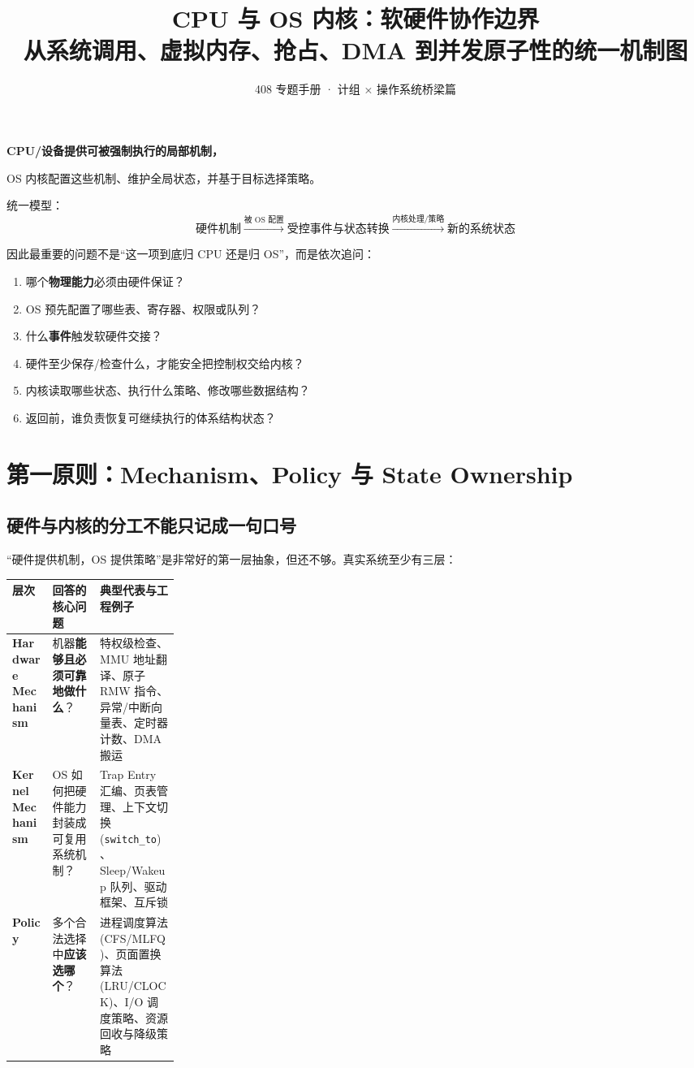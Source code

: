 \documentclass[11pt,a4paper]{ctexart}
\title{\vspace{-1.2cm}\textbf{CPU 与 OS 内核：软硬件协作边界}\\[0.35em]
\large 从系统调用、虚拟内存、抢占、DMA 到并发原子性的统一机制图}
\author{408 专题手册 · 计组 × 操作系统桥梁篇}
\date{}
\newcommand{\kw}[1]{\textbf{#1}}
\newcommand{\code}[1]{\texttt{#1}}
\begin{document}
\maketitle

\begin{corebox}
\begin{center}
\Large\bfseries CPU/设备提供可被强制执行的局部机制，\par
OS 内核配置这些机制、维护全局状态，并基于目标选择策略。
\end{center}

统一模型：
\[
\boxed{
\text{硬件机制}
\xrightarrow{\text{被 OS 配置}}
\text{受控事件与状态转换}
\xrightarrow{\text{内核处理/策略}}
\text{新的系统状态}
}
\]

因此最重要的问题不是“这一项到底归 CPU 还是归 OS”，而是依次追问：
\begin{enumerate}
  \item 哪个\kw{物理能力}必须由硬件保证？
  \item OS 预先配置了哪些表、寄存器、权限或队列？
  \item 什么\kw{事件}触发软硬件交接？
  \item 硬件至少保存/检查什么，才能安全把控制权交给内核？
  \item 内核读取哪些状态、执行什么策略、修改哪些数据结构？
  \item 返回前，谁负责恢复可继续执行的体系结构状态？
\end{enumerate}
\end{corebox}

\tableofcontents
\newpage

\section{第一原则：Mechanism、Policy 与 State Ownership}

\subsection{硬件与内核的分工不能只记成一句口号}
“硬件提供机制，OS 提供策略”是非常好的第一层抽象，但还不够。真实系统至少有三层：

\begingroup
\small
\renewcommand{\arraystretch}{1.25}
\setlength{\tabcolsep}{6pt}
\begin{tabularx}{\linewidth}{>{\bfseries}p{0.24\linewidth} X X}
\toprule
层次 & 回答的核心问题 & 典型代表与工程例子\\
\midrule
Hardware Mechanism & 机器\kw{能够且必须可靠地做什么}？ & 特权级检查、MMU 地址翻译、原子 RMW 指令、异常/中断向量表、定时器计数、DMA 搬运\\
Kernel Mechanism & OS 如何把硬件能力封装成可复用系统机制？ & Trap Entry 汇编、页表管理、上下文切换 (\code{switch\_to})、Sleep/Wakeup 队列、驱动框架、互斥锁\\
Policy & 多个合法选择中\kw{应该选哪个}？ & 进程调度算法 (CFS/MLFQ)、页面置换算法 (LRU/CLOCK)、I/O 调度策略、资源回收与降级策略\\
\bottomrule
\end{tabularx}
\endgroup
\end{document}

